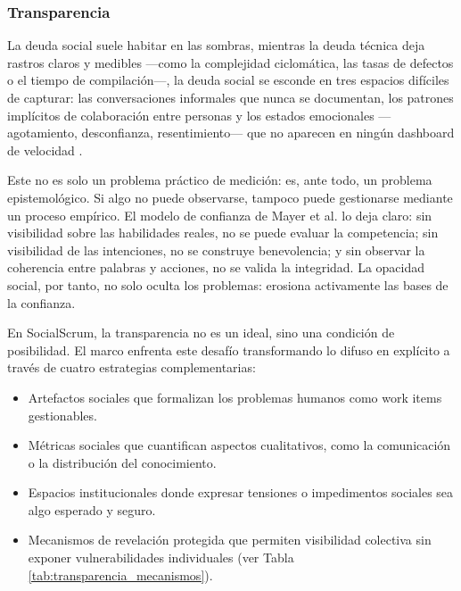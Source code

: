 \subsubsection{Transparencia}

La deuda social suele habitar en las sombras, mientras la deuda técnica deja rastros claros y medibles —como la complejidad ciclomática, las tasas de defectos o el tiempo de compilación—, la deuda social se esconde en tres espacios difíciles de capturar:
las conversaciones informales que nunca se documentan, los patrones implícitos de colaboración entre personas y los estados emocionales —agotamiento, desconfianza, resentimiento— que no aparecen en ningún dashboard de velocidad \cite{tamburri2015insights,saeeda2024nontechnicaldebt}.

Este no es solo un problema práctico de medición: es, ante todo, un problema epistemológico.
Si algo no puede observarse, tampoco puede gestionarse mediante un proceso empírico.
El modelo de confianza de Mayer et al. \cite{mayer_integrative_1995} lo deja claro: sin visibilidad sobre las habilidades reales, no se puede evaluar la competencia; sin visibilidad de las intenciones, no se construye benevolencia; y sin observar la coherencia entre palabras y acciones, no se valida la integridad.
La opacidad social, por tanto, no solo oculta los problemas: erosiona activamente las bases de la confianza.

En SocialScrum, la transparencia no es un ideal, sino una condición de posibilidad.
El marco enfrenta este desafío transformando lo difuso en explícito a través de cuatro estrategias complementarias:
\begin{itemize}
    \item Artefactos sociales que formalizan los problemas humanos como work items gestionables.
    \item Métricas sociales que cuantifican aspectos cualitativos, como la comunicación o la distribución del conocimiento.
    \item Espacios institucionales donde expresar tensiones o impedimentos sociales sea algo esperado y seguro.
    \item Mecanismos de revelación protegida que permiten visibilidad colectiva sin exponer vulnerabilidades individuales (ver Tabla \ref{tab:transparencia_mecanismos}).
\end{itemize}

\begingroup
\scriptsize
\setlength{\LTleft}{0pt} %
\setlength{\LTright}{0pt} %
\setlength{\tabcolsep}{4pt} %
\renewcommand{\arraystretch}{1.4}

